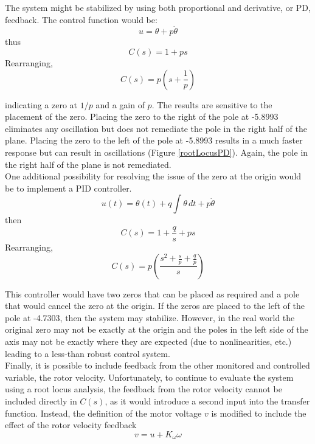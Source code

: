 \documentclass[12pt,letterpaper]{article}
\begin{document}
The system might be stabilized by using both proportional and derivative, or PD, feedback.  The control function would be:
\begin{equation}
	u = \theta + p\dot{\theta}
\end{equation}
thus
\begin{equation}
	C(s) = 1 + p s
\end{equation}
Rearranging,
\begin{equation}
	C(s) = p\left(s+\frac{1}{p}\right)\label{pd}
\end{equation}

indicating a zero at $1/p$ and a gain of $p$.
The results are sensitive to the placement of the zero.  Placing the zero to the right of the pole at -5.8993 
eliminates any oscillation but does not remediate the pole in the right half of the plane.  Placing the zero to the left of the pole at -5.8993 results in a much faster response but can result in oscillations (Figure \ref{rootLocusPD}).  Again, the pole in the right half of the plane is not remediated. \\


One additional possibility for resolving the issue of the zero at the origin would be to implement a PID controller.
\begin{equation*}
	u(t) = \theta(t) + q\int \theta\,dt + p\dot{\theta}
\end{equation*}
then
\begin{equation}
	C(s) = 1 + \frac{q}{s} + p s
\end{equation}
Rearranging,
\begin{equation}
	C(s) = p\left(\frac{s^2+\frac{s}{p}+\frac{q}{p}}{s}\right)
\end{equation}

This controller would have two zeros that can be placed as required and a pole that would cancel
the zero at the origin.  If the zeros are placed to the left of the pole at -4.7303, then the system may stabilize.
However, in the real world the original zero may not be exactly at the origin and the poles in the left side of the axis may not be exactly where they are expected (due to nonlinearities, etc.) 
leading to a less-than robust control system. \\

Finally, it is possible to include feedback from the other monitored and controlled variable, the rotor velocity.
Unfortunately, to continue to evaluate the system using a root locus analysis, the feedback from
the rotor velocity cannot be included directly in $C(s)$, as it would introduce a second input into the transfer function.  
Instead, the definition of the motor voltage $v$ is modified to include the effect of the rotor velocity feedback
\begin{equation}
    v = u + K_{\omega}\omega
\end{equation}
\end{document}
